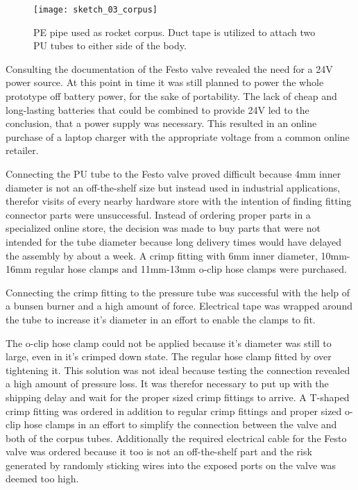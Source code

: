 \begin{figure}[hp]
\centering

\texttt{[image: sketch\_03\_corpus]}

\caption{PE pipe used as rocket corpus. Duct tape is utilized to attach two PU tubes to either side of the body.}
\end{figure}

Consulting the documentation of the Festo valve revealed the need for a 24V power source. At this point in time it was still planned to power the whole prototype off battery power, for the sake of portability. The lack of cheap and long-lasting batteries that could be combined to provide 24V led to the conclusion, that a power supply was necessary. This resulted in an online purchase of a laptop charger \cite{power-supply} with the appropriate voltage from a common online retailer.

Connecting the PU tube to the Festo valve proved difficult because 4mm inner diameter is not an off-the-shelf size but instead used in industrial applications, therefor visits of every nearby hardware store with the intention of finding fitting connector parts were unsuccessful. Instead of ordering proper parts in a specialized online store, the decision was made to buy parts that were not intended for the tube diameter because long delivery times would have delayed the assembly by about a week. A crimp fitting with 6mm inner diameter, 10mm-16mm regular hose clamps and 11mm-13mm o-clip hose clamps were purchased. 

Connecting the crimp fitting to the pressure tube was successful with the help of a bunsen burner and a high amount of force. Electrical tape was wrapped around the tube to increase it's diameter in an effort to enable the clamps to fit.

The o-clip hose clamp could not be applied because it's diameter was still to large, even in it's crimped down state. The regular hose clamp fitted by over tightening it. This solution was not ideal because testing the connection revealed a high amount of pressure loss. It was therefor necessary to put up with the shipping delay and wait for the proper sized crimp fittings to arrive. A T-shaped crimp fitting was ordered in addition to regular crimp fittings and proper sized o-clip hose clamps in an effort to simplify the connection between the valve and both of the corpus tubes. Additionally the required electrical cable for the Festo valve was ordered because it too is not an off-the-shelf part and the risk generated by randomly sticking wires into the exposed ports on the valve was deemed too high.

